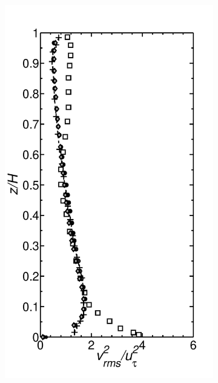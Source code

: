 \documentclass[times]{fldauth}
\begin{document}
\begin{figure}
\begin{subfigure}[t]{0.29\textwidth}
                \includegraphics[width=\linewidth]{Fig3/vrms_filter_paper.pdf}
                \caption{}
                \label{fig:vrms}
        \end{subfigure}%
        \centering
        \begin{subfigure}[t]{0.29\textwidth}

\end{subfigure}
\end{figure}
\end{document}
